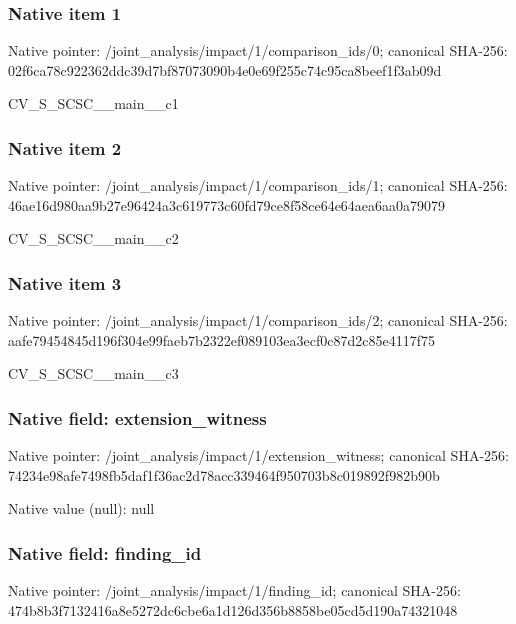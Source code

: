 \documentclass[10pt,a4paper]{article}
\begin{document}
\subsubsection{Native item 1}


Native pointer: /joint\_analysis/impact/1\allowbreak{}/comparison\_ids/0; canonical SHA-256: 02f6ca78c922362ddc39d7bf\allowbreak{}87073090b4e0e69f255c74c9\allowbreak{}5ca8beef1f3ab09d


CV\_S\_SCSC\_\_main\_\_c1


\subsubsection{Native item 2}


Native pointer: /joint\_analysis/impact/1\allowbreak{}/comparison\_ids/1; canonical SHA-256: 46ae16d980aa9b27e96424a3\allowbreak{}c619773c60fd79ce8f58ce64\allowbreak{}e64aea6aa0a79079


CV\_S\_SCSC\_\_main\_\_c2


\subsubsection{Native item 3}


Native pointer: /joint\_analysis/impact/1\allowbreak{}/comparison\_ids/2; canonical SHA-256: aafe79454845d196f304e99f\allowbreak{}aeb7b2322ef089103ea3ecf0\allowbreak{}c87d2c85e4117f75


CV\_S\_SCSC\_\_main\_\_c3


\subsubsection{Native field: extension\_witness}


Native pointer: /joint\_analysis/impact/1\allowbreak{}/extension\_witness; canonical SHA-256: 74234e98afe7498fb5daf1f3\allowbreak{}6ac2d78acc339464f950703b\allowbreak{}8c019892f982b90b



Native value (null): null



\subsubsection{Native field: finding\_id}


Native pointer: /joint\_analysis/impact/1/finding\_id; canonical SHA-256: 474b8b3f7132416a8e5272dc\allowbreak{}6cbe6a1d126d356b8858be05\allowbreak{}cd5d190a74321048
\end{document}
